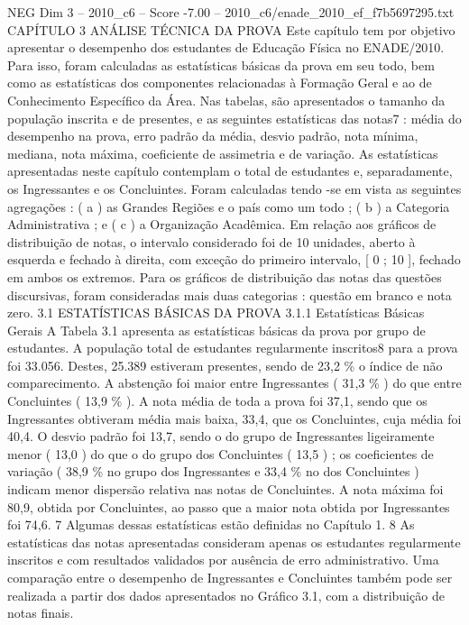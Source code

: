 \begin{textsample}{NEG Dim 3 – 2010\_c6 – Score -7.00 – 2010\_c6/enade\_2010\_ef\_f7b5697295.txt}  \label{ex:f3_neg_002}
CAPÍTULO 3 ANÁLISE TÉCNICA DA PROVA Este capítulo tem por objetivo apresentar o desempenho dos estudantes de Educação Física no ENADE/2010.
Para isso, foram calculadas as estatísticas básicas da prova em seu todo, bem como as estatísticas dos componentes relacionadas à Formação Geral e ao de Conhecimento Específico da Área.
Nas tabelas, são apresentados o tamanho da população inscrita e de presentes, e as seguintes estatísticas das notas7 : média do desempenho na prova, erro padrão da média, desvio padrão, nota mínima, mediana, nota máxima, coeficiente de assimetria e de variação.
As estatísticas apresentadas neste capítulo contemplam o total de estudantes e, separadamente, os Ingressantes e os Concluintes.
Foram calculadas tendo -se em vista as seguintes agregações : ( a ) as Grandes Regiões e o país como um todo ; ( b ) a Categoria Administrativa ; e ( c ) a Organização Acadêmica.
Em relação aos gráficos de distribuição de notas, o intervalo considerado foi de 10 unidades, aberto à esquerda e fechado à direita, com exceção do primeiro intervalo, [ 0 ; 10 ], fechado em ambos os extremos.
Para os gráficos de distribuição das notas das questões discursivas, foram consideradas mais duas categorias : questão em branco e nota zero. 3.1 ESTATÍSTICAS BÁSICAS DA PROVA 3.1.1 Estatísticas Básicas Gerais A Tabela 3.1 apresenta as estatísticas básicas da prova por grupo de estudantes.
A população total de estudantes regularmente inscritos8 para a prova foi 33.056.
Destes, 25.389 estiveram presentes, sendo de 23,2 \% o índice de não comparecimento.
A abstenção foi maior entre Ingressantes ( 31,3 \% ) do que entre Concluintes ( 13,9 \% ).
A nota média de toda a prova foi 37,1, sendo que os Ingressantes obtiveram média mais baixa, 33,4, que os Concluintes, cuja média foi 40,4.
O desvio padrão foi 13,7, sendo o do grupo de Ingressantes ligeiramente menor ( 13,0 ) do que o do grupo dos Concluintes ( 13,5 ) ; os coeficientes de variação ( 38,9 \% no grupo dos Ingressantes e 33,4 \% no dos Concluintes ) indicam menor dispersão relativa nas notas de Concluintes.
A nota máxima foi 80,9, obtida por Concluintes, ao passo que a maior nota obtida por Ingressantes foi 74,6. 7 Algumas dessas estatísticas estão definidas no Capítulo 1. 8 As estatísticas das notas apresentadas consideram apenas os estudantes regularmente inscritos e com resultados validados por ausência de erro administrativo.
Uma comparação entre o desempenho de Ingressantes e Concluintes também pode ser realizada a partir dos dados apresentados no Gráfico 3.1, com a distribuição de notas finais.

\end{textsample}
